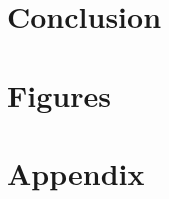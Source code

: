 \documentclass[journal, twocolumn, final,11pt,letterpaper]{IEEEtran}
\begin{document}
\section{Conclusion} 
%
%		



\section{Figures}
\section{Appendix}



     
\end{document}
